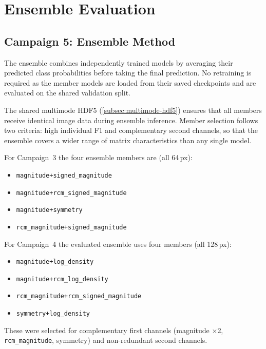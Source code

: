 \section{Ensemble Evaluation}\label{sec:ensemble}

\subsection{Campaign 5: Ensemble Method}\label{subsec:ensemble-method}

The ensemble combines independently trained models by averaging their predicted class probabilities before taking the final prediction.
No retraining is required as the member models are loaded from their saved checkpoints and are
evaluated on the shared validation split.

The shared multimode HDF5 (\autoref{subsec:multimode-hdf5}) ensures that all members
receive identical image data during ensemble inference.
Member selection follows two criteria: high individual F1 and complementary second
channels, so that the ensemble covers a wider range of matrix characteristics than
any single model.

For Campaign~3 the four ensemble members are (all 64\,px):
\begin{itemize}
  \item \texttt{magnitude+signed\_magnitude}
  \item \texttt{magnitude+rcm\_signed\_magnitude}
  \item \texttt{magnitude+symmetry}
  \item \texttt{rcm\_magnitude+signed\_magnitude}
\end{itemize}

For Campaign~4 the evaluated ensemble uses four members (all 128\,px):
\begin{itemize}
  \item \texttt{magnitude+log\_density}
  \item \texttt{magnitude+rcm\_log\_density}
  \item \texttt{rcm\_magnitude+rcm\_signed\_magnitude}
  \item \texttt{symmetry+log\_density}
\end{itemize}
These were selected for complementary first channels (magnitude $\times$2, \texttt{rcm\_magnitude}, symmetry)
and non-redundant second channels.

